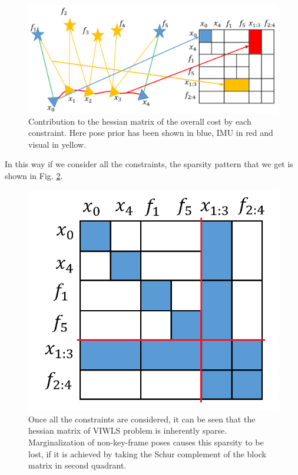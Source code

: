 \begin{figure}[ht]
	\centering
		\includegraphics[width=1.00\textwidth]{images/HessianSparsity.png}
  \caption{Contribution to the hessian matrix of the overall cost by each constraint. Here pose prior has been shown in blue, IMU in red and visual in yellow.}
  \label{fig:HessianSparsity}
\end{figure}

In this way if we consider all the constraints, the sparsity pattern that we get is shown in Fig. \ref{fig:HessianSparsityAllFillUp}.

\begin{figure}[ht]
	\centering
		\includegraphics[width=1.00\textwidth]{images/HessianSparsityAllFillUp.png}
  \caption{Once all the constraints are considered, it can be seen that the hessian matrix of VIWLS problem is inherently sparse. Marginalization of non-key-frame poses causes this sparsity to be lost, if it is achieved by taking the Schur complement of the block matrix in second quadrant.}
  \label{fig:HessianSparsityAllFillUp}
\end{figure}

